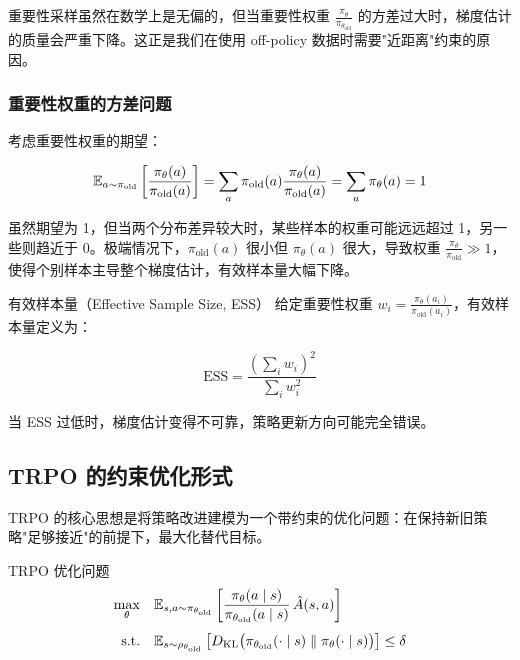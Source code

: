 \begin{remark}
重要性采样虽然在数学上是无偏的，但当重要性权重 $\frac{\pi_\theta}{\pi_{\theta_{\text{old}}}}$ 的方差过大时，梯度估计的质量会严重下降。这正是我们在使用 off-policy 数据时需要"近距离"约束的原因。
\end{remark}

\subsubsection{重要性权重的方差问题}

考虑重要性权重的期望：

\[
\mathbb{E}_{a \sim \pi_{\text{old}}} \left[ \frac{\pi_\theta(a)}{\pi_{\text{old}}(a)} \right]
= \sum_a \pi_{\text{old}}(a) \frac{\pi_\theta(a)}{\pi_{\text{old}}(a)} = \sum_a \pi_\theta(a) = 1
\]

虽然期望为 1，但当两个分布差异较大时，某些样本的权重可能远远超过 1，另一些则趋近于 0。极端情况下，$\pi_{\text{old}}(a)$ 很小但 $\pi_\theta(a)$ 很大，导致权重 $\frac{\pi_\theta}{\pi_{\text{old}}} \gg 1$，使得个别样本主导整个梯度估计，有效样本量大幅下降。

\begin{mydefinition}{{有效样本量（Effective Sample Size, ESS）}}
给定重要性权重 $w_i = \frac{\pi_\theta(a_i)}{\pi_{\text{old}}(a_i)}$，有效样本量定义为：

\[
\text{ESS} = \frac{(\sum_i w_i)^2}{\sum_i w_i^2}
\]

当 ESS 过低时，梯度估计变得不可靠，策略更新方向可能完全错误。
\end{mydefinition}

\subsection{TRPO 的约束优化形式}

TRPO 的核心思想是将策略改进建模为一个带约束的优化问题：在保持新旧策略"足够接近"的前提下，最大化替代目标。

\begin{mydefinition}{TRPO 优化问题}
\[
\begin{aligned}
\max_{\theta} \quad & \mathbb{E}_{s, a \sim \pi_{\theta_{\text{old}}}}
\left[ \frac{\pi_\theta(a \mid s)}{\pi_{\theta_{\text{old}}}(a \mid s)} \, \hat{A}(s, a) \right] \\[4pt]
\text{s.t.} \quad & \mathbb{E}_{s \sim \rho_{\theta_{\text{old}}}}
\left[ D_{\text{KL}}\big( \pi_{\theta_{\text{old}}}(\cdot \mid s) \;\|\; \pi_\theta(\cdot \mid s) \big) \right] \le \delta
\end{aligned}
\]
\end{mydefinition}

